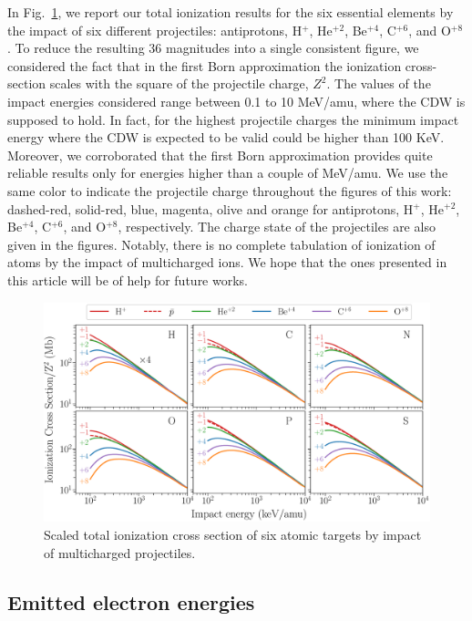 \documentclass[preprint,12pt]{article}
\begin{document}
In Fig.~\ref{fig:atomscaling}, we report our total ionization results 
for the six essential elements by the impact of six different projectiles: 
antiprotons, H$^{+}$, He$^{+2}$, Be$^{+4}$, C$^{+6}$, and O$^{+8}$. 
To reduce the resulting 36 magnitudes into a single consistent 
figure, we considered the fact that in the first Born approximation
the ionization cross-section scales with the square of the projectile 
charge, $Z^{2}$. The values of the impact energies considered 
range between 0.1 to 10 MeV/amu, where the CDW is supposed 
to hold. In fact, for the highest projectile charges the minimum 
impact energy where the CDW is expected to be valid could be 
higher than 100 KeV. Moreover, we corroborated that the first Born 
approximation provides quite reliable results only for energies higher 
than a couple of MeV/amu. We use the same color to indicate the 
projectile charge throughout the figures of this work: dashed-red, 
solid-red, blue, magenta, olive and orange for antiprotons, 
H$^{+}$, He$^{+2}$, Be$^{+4}$, C$^{+6}$, and O$^{+8}$, respectively. 
The charge state of the projectiles are also given in the figures.
Notably, there is no complete tabulation of ionization of atoms by 
the impact of multicharged ions. We hope that the ones presented 
in this article will be of help for future works.

\begin{figure}[t!]
\centering
\includegraphics[width=\textwidth]{figuras/atomicscaling.eps}
\caption{Scaled total ionization cross section of six atomic targets 
by impact of multicharged projectiles.}
\label{fig:atomscaling}
\end{figure} 

\subsection{Emitted electron energies}
\end{document}
